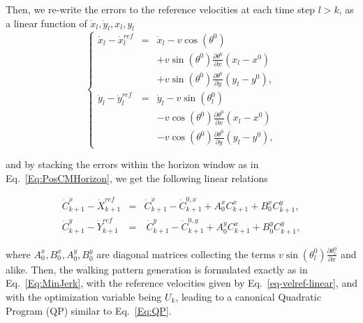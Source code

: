 Then, we re-write the errors to the reference velocities at each time step $l>k$, as a linear function of $\dot{x}_l,\dot{y}_l,x_l,y_l$
$$
\left\{
\begin{array}{ccc}
\dot{x}_l-\dot{x}^{ref}_l & = & \dot{x}_l - v\cos(\theta^0)\\
&& + v\sin(\theta^0) \frac{\partial \theta^0}{\partial x}  (x_l-x^0)\\
&& + v\sin(\theta^0) \frac{\partial \theta^0}{\partial y}  (y_l-y^0),\\
\dot{y}_l-\dot{y}^{ref}_l & = & \dot{y}_l - v\sin(\theta^0_l)\\
&& - v\cos(\theta^0) \frac{\partial \theta^0}{\partial x}  (x_l-x^0)\\
&& - v\cos(\theta^0) \frac{\partial \theta^0}{\partial y}  (y_l-y^0),
\end{array}
\right.
$$ 

and by stacking the errors within the horizon window as in Eq.~\ref{Eq:PosCMHorizon}, we get the following 
linear relations

\begin{eqnarray}
\nonumber
 \dot{C}_{k+1}^{x}  - \dot{X}_{k+1}^{ref} & = &    \dot{C}_{k+1}^{x} -   \dot{C}_{k+1}^{0,x}  + A^x_{0} C_{k+1}^{x}  + B^x_{0} C_{k+1}^{y},\\
 \dot{C}_{k+1}^{y} - \dot{Y}_{k+1}^{ref} & = &   \ \dot{C}_{k+1}^{y} - \dot{C}_{k+1}^{0,y} + A^y_{0} C_{k+1}^{x} + B^y_{0}  C_{k+1}^{y},
 \label{eq-velref-linear}
 \end{eqnarray}

where $A^x_{0},B^x_{0},A^y_{0},B^y_{0}$ are diagonal matrices collecting the terms $v\sin(\theta^0_l) \frac{\partial \theta^0_l}{\partial x}$ and alike. Then, the walking pattern generation is formulated exactly as in Eq.~\ref{Eq:MinJerk}, with the reference velocities given by Eq.~\ref{eq-velref-linear}, and with the optimization variable being $U_{k}$,
leading to a canonical Quadratic Program (QP) similar to Eq.~\ref{Eq:QP}.


